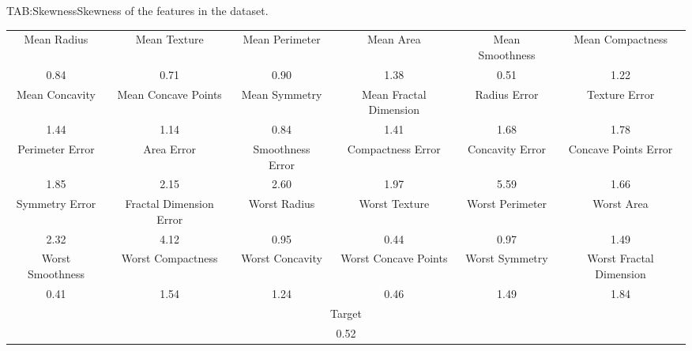 \begin{table}[Skewness]{TAB:Skewness}{Skewness of the features in the dataset.}
    \begin{adjustbox}{width=1\linewidth}

        \small
        \begin{tabular}{|c|c|c|c|c|c|}

            \hline
            Mean Radius      & Mean Texture            & Mean Perimeter   & Mean Area              & Mean Smoothness & Mean Compactness        \\

            0.84             & 0.71                    & 0.90             & 1.38                   & 0.51            & 1.22                    \\
            \hline
            Mean Concavity   & Mean Concave Points     & Mean Symmetry    & Mean Fractal Dimension & Radius Error    & Texture Error           \\
            1.44             & 1.14                    & 0.84             & 1.41                   & 1.68            & 1.78                    \\
            \hline
            Perimeter Error  & Area Error              & Smoothness Error & Compactness Error      & Concavity Error & Concave Points Error    \\
            1.85             & 2.15                    & 2.60             & 1.97                   & 5.59            & 1.66                    \\
            \hline
            Symmetry Error   & Fractal Dimension Error & Worst Radius     & Worst Texture          & Worst Perimeter & Worst Area              \\
            2.32             & 4.12                    & 0.95             & 0.44                   & 0.97            & 1.49                    \\
            \hline
            Worst Smoothness & Worst Compactness       & Worst Concavity  & Worst Concave Points   & Worst Symmetry  & Worst Fractal Dimension \\
            0.41             & 1.54                    & 1.24             & 0.46                   & 1.49            & 1.84                    \\
            \hline
            \hline

            \multicolumn{6}{|c|}{Target} \\
            \multicolumn{6}{|c|}{0.52} \\
            \hline
        \end{tabular}
    \end{adjustbox}

\end{table}

